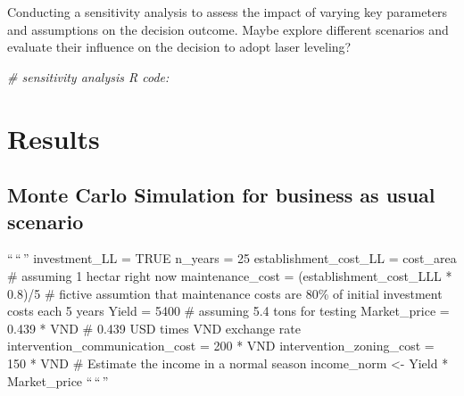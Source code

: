 \documentclass[
]{article}
\newenvironment{Shaded}{\begin{snugshade}}{\end{snugshade}}
\newcommand{\CommentTok}[1]{\textcolor[rgb]{0.56,0.35,0.01}{\textit{#1}}}
\begin{document}
Conducting a sensitivity analysis to assess the impact of varying key
parameters and assumptions on the decision outcome. Maybe explore
different scenarios and evaluate their influence on the decision to
adopt laser leveling?

\begin{Shaded}
\begin{Highlighting}[]
\CommentTok{\# sensitivity analysis R code:}
\end{Highlighting}
\end{Shaded}

\hypertarget{results}{%
\section{Results}\label{results}}

\hypertarget{monte-carlo-simulation-for-business-as-usual-scenario}{%
\subsection{Monte Carlo Simulation for business as usual
scenario}\label{monte-carlo-simulation-for-business-as-usual-scenario}}

``\,``\,'' investment\_LL = TRUE n\_years = 25 establishment\_cost\_LL =
cost\_area \# assuming 1 hectar right now maintenance\_cost =
(establishment\_cost\_LLL * 0.8)/5 \# fictive assumtion that maintenance
costs are 80\% of initial investment costs each 5 years Yield = 5400 \#
assuming 5.4 tons for testing Market\_price = 0.439 * VND \# 0.439 USD
times VND exchange rate intervention\_communication\_cost = 200 * VND
intervention\_zoning\_cost = 150 * VND \# Estimate the income in a
normal season income\_norm \textless- Yield * Market\_price ``\,``\,''
\end{document}
